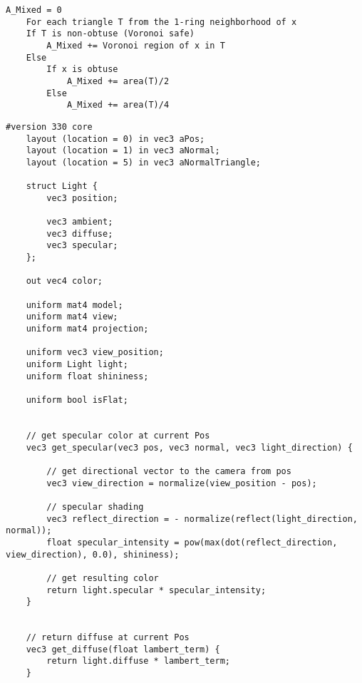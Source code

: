 \vspace{10pt}

\begin{lstlisting}[caption={Region $\mathcal{A}_{Mixed}$ on an arbitrary mesh. \cite{meshlab} (Section: \ref{section:localaveraging})\label{appendix:localaveraging}}]
    A_Mixed = 0
    For each triangle T from the 1-ring neighborhood of x
    If T is non-obtuse (Voronoi safe)
        A_Mixed += Voronoi region of x in T
    Else
        If x is obtuse
            A_Mixed += area(T)/2
        Else
            A_Mixed += area(T)/4
    \end{lstlisting}

\vspace{10pt}

\begin{lstlisting}[caption={Vertex Shader for vertex/triangle flat shading and triangle Gouraud shading using lighting (Section: \ref{section:extend-flat-shading-lighting})\label{appendix:vs-flat-shading-lighting}}]
    #version 330 core
    layout (location = 0) in vec3 aPos;
    layout (location = 1) in vec3 aNormal;
    layout (location = 5) in vec3 aNormalTriangle;

    struct Light {
        vec3 position;

        vec3 ambient;
        vec3 diffuse;
        vec3 specular;
    };

    out vec4 color;

    uniform mat4 model;
    uniform mat4 view;
    uniform mat4 projection;

    uniform vec3 view_position;
    uniform Light light;
    uniform float shininess;

    uniform bool isFlat;


    // get specular color at current Pos
    vec3 get_specular(vec3 pos, vec3 normal, vec3 light_direction) {

        // get directional vector to the camera from pos
        vec3 view_direction = normalize(view_position - pos);

        // specular shading
        vec3 reflect_direction = - normalize(reflect(light_direction, normal));
        float specular_intensity = pow(max(dot(reflect_direction, view_direction), 0.0), shininess);

        // get resulting color
        return light.specular * specular_intensity;
    }


    // return diffuse at current Pos
    vec3 get_diffuse(float lambert_term) {
        return light.diffuse * lambert_term;
    }


\end{lstlisting}
